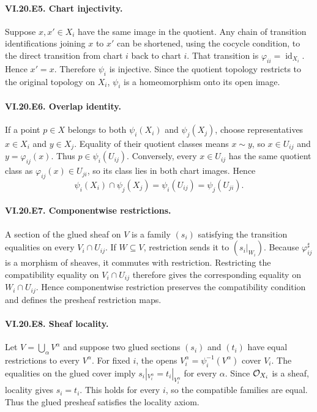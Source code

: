 \paragraph{VI.20.E5. Chart injectivity.}
\begin{solution}
Suppose $x,x'\in X_i$ have the same image in the quotient.  Any chain of transition identifications joining $x$ to $x'$ can be shortened, using the cocycle condition, to the direct transition from chart $i$ back to chart $i$.  That transition is $\varphi_{ii}=\operatorname{id}_{X_i}$.  Hence $x'=x$.  Therefore $\psi_i$ is injective.  Since the quotient topology restricts to the original topology on $X_i$, $\psi_i$ is a homeomorphism onto its open image.
\end{solution}

\paragraph{VI.20.E6. Overlap identity.}
\begin{solution}
If a point $p\in X$ belongs to both $\psi_i(X_i)$ and $\psi_j(X_j)$, choose representatives $x\in X_i$ and $y\in X_j$.  Equality of their quotient classes means $x\sim y$, so $x\in U_{ij}$ and $y=\varphi_{ij}(x)$.  Thus $p\in\psi_i(U_{ij})$.  Conversely, every $x\in U_{ij}$ has the same quotient class as $\varphi_{ij}(x)\in U_{ji}$, so its class lies in both chart images.  Hence
\[
\psi_i(X_i)\cap\psi_j(X_j)=\psi_i(U_{ij})=\psi_j(U_{ji}).
\]
\end{solution}

\paragraph{VI.20.E7. Componentwise restrictions.}
\begin{solution}
A section of the glued sheaf on $V$ is a family $(s_i)$ satisfying the transition equalities on every $V_i\cap U_{ij}$.  If $W\subseteq V$, restriction sends it to $(s_i|_{W_i})$.  Because $\varphi_{ij}^{\sharp}$ is a morphism of sheaves, it commutes with restriction.  Restricting the compatibility equality on $V_i\cap U_{ij}$ therefore gives the corresponding equality on $W_i\cap U_{ij}$.  Hence componentwise restriction preserves the compatibility condition and defines the presheaf restriction maps.
\end{solution}

\paragraph{VI.20.E8. Sheaf locality.}
\begin{solution}
Let $V=\bigcup_\alpha V^\alpha$ and suppose two glued sections $(s_i)$ and $(t_i)$ have equal restrictions to every $V^\alpha$.  For fixed $i$, the opens $V_i^\alpha=\psi_i^{-1}(V^\alpha)$ cover $V_i$.  The equalities on the glued cover imply
$s_i|_{V_i^\alpha}=t_i|_{V_i^\alpha}$ for every $\alpha$.  Since $\mathcal O_{X_i}$ is a sheaf, locality gives $s_i=t_i$.  This holds for every $i$, so the compatible families are equal.  Thus the glued presheaf satisfies the locality axiom.
\end{solution}

